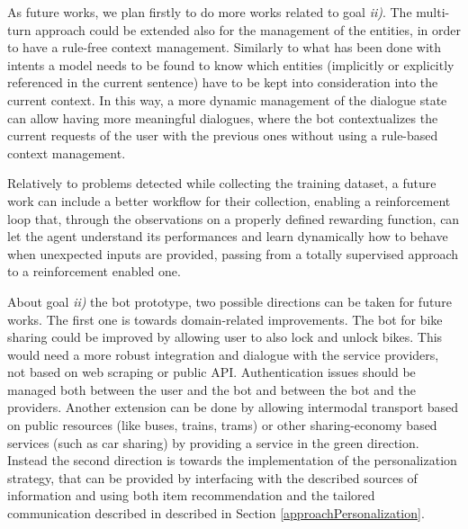 As future works, we plan firstly to do more works related to goal \textit{ii)}. The multi-turn approach could be extended also for the management of the entities, in order to have a rule-free context management. Similarly to what has been done with intents a model needs to be found to know which entities (implicitly or explicitly referenced in the current sentence) have to be kept into consideration into the current context. In this way, a more dynamic management of the dialogue state can allow having more meaningful dialogues, where the bot contextualizes the current requests of the user with the previous ones without using a rule-based context management.

Relatively to problems detected while collecting the training dataset, a future work can include a better workflow for their collection, enabling a reinforcement loop that, through the observations on a properly defined rewarding function, can let the agent understand its performances and learn dynamically how to behave when unexpected inputs are provided, passing from a totally supervised approach to a reinforcement enabled one.

About  goal \textit{ii)} the bot prototype, two possible directions can be taken for future works. The first one is towards domain-related improvements. The bot for bike sharing could be improved by allowing user to also lock and unlock bikes. This would need a more robust integration and dialogue with the service providers, not based on web scraping or public API. Authentication issues should be managed both between the user and the bot and between the bot and the providers. Another extension can be done by allowing intermodal transport based on public resources (like buses, trains, trams) or other sharing-economy based services (such as car sharing) by providing a service in the green direction. Instead the second direction is towards the implementation of the personalization strategy, that can be provided by interfacing with the described sources of information and using both item recommendation and the tailored communication described in described in Section \ref{approachPersonalization}.
